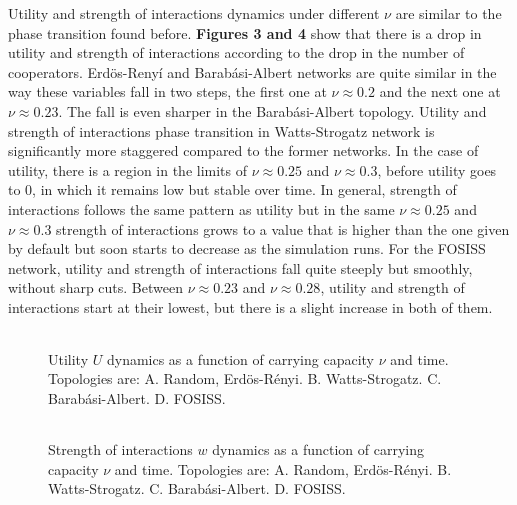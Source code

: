 \documentclass{bmcart}
\def\texttt{[image: ]}
\begin{document}
Utility and strength of interactions dynamics under different $\nu$ are
similar to the phase transition found before. \textbf{Figures 3 and 4}
show that there is a drop in utility and strength of interactions
according to the drop in the number of cooperators. Erd\"{o}s-Reny\'i
and Barab\'asi-Albert networks are quite similar in the way these
variables fall in two steps, the first one at $\nu \approx 0.2$ and
the next one at $\nu \approx 0.23$. The fall is even sharper in the
Barab\'asi-Albert topology. Utility and strength of interactions phase
transition in Watts-Strogatz network is significantly more staggered
compared to the former networks. In the case of utility, there is a
region in the limits of $\nu \approx 0.25$ and $\nu \approx 0.3$,
before utility goes to $0$, in which it remains low but stable over
time. In general, strength of interactions follows the same pattern as
utility but in the same $\nu \approx 0.25$ and $\nu \approx 0.3$
strength of interactions grows to a value that is higher than the one
given by default but soon starts to decrease as the simulation
runs. For the FOSISS network, utility and strength of interactions fall
quite steeply but smoothly, without sharp cuts. Between
$\nu \approx 0.23$ and $\nu \approx 0.28$, utility and strength of
interactions start at their lowest,
but there is a slight increase in both of them.\\


\begin{figure} [h!]
\centering
\begin{tabular}{cc}

\end{tabular}
\caption{Utility $U$ dynamics as a function of carrying capacity $\nu$ and time. Topologies are: A. Random, Erd\"{o}s-R\'enyi. B. Watts-Strogatz. C. Barab\'asi-Albert. D. FOSISS.}\label{fitness}
\end{figure}



\begin{figure} [h!]
\centering
\begin{tabular}{cc}

\end{tabular}
\caption{Strength of interactions $w$ dynamics as a function of carrying capacity $\nu$ and time. Topologies are: A. Random, Erd\"{o}s-R\'enyi. B. Watts-Strogatz. C. Barab\'asi-Albert. D. FOSISS.}\label{trust}
\end{figure}
\end{document}
